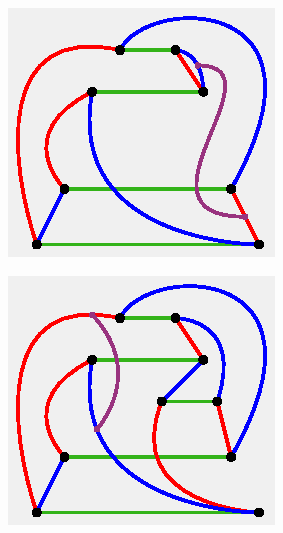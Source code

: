 \documentclass[11pt, oneside]{amsart}
\theoremstyle{theorem}
\theoremstyle{definition}
\theoremstyle{theorem}
\begin{document}
\begin{figure}[h!]
\begin{subfigure}{.24\textwidth}
  \label{oxb3}
\end{subfigure}%
\begin{subfigure}{.24\textwidth}
  \centering
  \includegraphics[width=.9\linewidth]{hbt4.eps}
  \label{oxb4}
\end{subfigure}
\begin{subfigure}{.24\textwidth}
  \centering
  \includegraphics[width=.9\linewidth]{hbt5.eps}
    \label{oxb5}
\end{subfigure}%
\begin{subfigure}{.24\textwidth}

\end{subfigure}
\end{figure}
\end{document}
